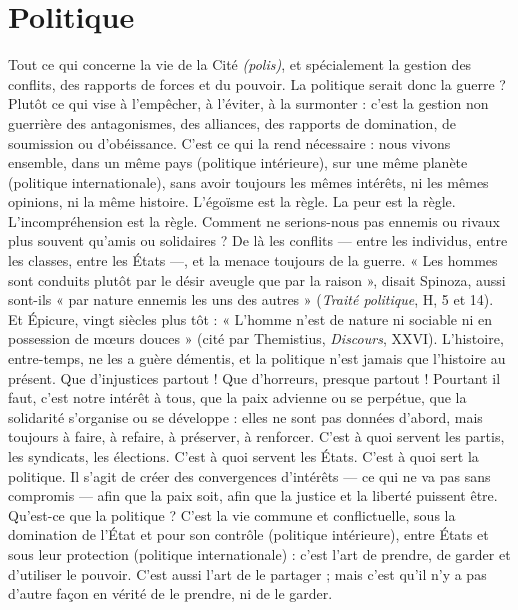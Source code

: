 \section{Politique}
Tout ce qui concerne la vie de la Cité {\it (polis)}, et spécialement
la gestion des conflits, des rapports de forces et du pouvoir. La
politique serait donc la guerre ? Plutôt ce qui vise à l'empêcher, à l'éviter, à la
surmonter : c’est la gestion non guerrière des antagonismes, des alliances, des
rapports de domination, de soumission ou d’obéissance. C’est ce qui la rend
nécessaire : nous vivons ensemble, dans un même pays (politique intérieure),
sur une même planète (politique internationale), sans avoir toujours les mêmes
intérêts, ni les mêmes opinions, ni la même histoire. L'égoïsme est la règle. La
peur est la règle. L’incompréhension est la règle. Comment ne serions-nous pas
ennemis ou rivaux plus souvent qu’amis ou solidaires ? De là les conflits — entre
les individus, entre les classes, entre les États —, et la menace toujours de la
guerre. « Les hommes sont conduits plutôt par le désir aveugle que par la
raison », disait Spinoza, aussi sont-ils « par nature ennemis les uns des autres »
({\it Traité politique}, H, 5 et 14). Et Épicure, vingt siècles plus tôt : « L'homme
n'est de nature ni sociable ni en possession de mœurs douces » (cité par Themistius,
{\it Discours}, XXVI). L'histoire, entre-temps, ne les a guère démentis, et la
politique n’est jamais que l’histoire au présent. Que d’injustices partout ! Que
d’horreurs, presque partout ! Pourtant il faut, c’est notre intérêt à tous, que la
paix advienne ou se perpétue, que la solidarité s’organise ou se développe : elles
ne sont pas données d’abord, mais toujours à faire, à refaire, à préserver, à renforcer.
C’est à quoi servent les partis, les syndicats, les élections. C’est à quoi
servent les États. C’est à quoi sert la politique. Il s’agit de créer des convergences
d’intérêts — ce qui ne va pas sans compromis — afin que la paix soit, afin
que la justice et la liberté puissent être. Qu'est-ce que la politique ? C’est la vie
commune et conflictuelle, sous la domination de l’État et pour son contrôle
(politique intérieure), entre États et sous leur protection (politique internationale) :
c’est l’art de prendre, de garder et d’utiliser le pouvoir. C’est aussi
l’art de le partager ; mais c’est qu’il n’y a pas d’autre façon en vérité de le
prendre, ni de le garder.


